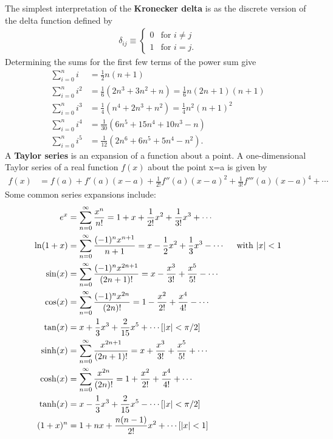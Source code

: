 The simplest interpretation of the \textbf{Kronecker delta} is as the discrete version of the delta function defined by 
\begin{align}
\delta_{ij}\equiv
\begin{cases}
0 & \textrm{for } i \neq j \\
1 & \textrm{for } i = j.
\end{cases}
\end{align}
Determining the sums for the first few terms of the power sum give
\begin{align}
\sum_{i=0}^{n}i   &=\frac{1}{2}n(n+1) \\
\sum_{i=0}^{n}i^2 &=\frac{1}{6}(2n^3+3n^2+n)=\frac{1}{6}n(2n+1)(n+1) \\
\sum_{i=0}^{n}i^3 &=\frac{1}{4}(n^4+2n^3+n^2)=\frac{1}{4}n^2(n+1)^2 \\
\sum_{i=0}^{n}i^4 &=\frac{1}{30}(6n^5+15n^4+10n^3-n) \\
\sum_{i=0}^{n}i^5 &=\frac{1}{12}(2n^6+6n^5+5n^4-n^2).
\end{align}
A \textbf{Taylor series} is an expansion of a function about a point. A one-dimensional Taylor series of a real function $f(x)$ about the point x=a is given by 
\begin{align}
f(x)&=f(a)+f'(a)(x-a)+\frac{1}{2!}f''(a)(x-a)^2+\frac{1}{3!}f'''(a)(x-a)^4+\cdots 
\end{align}
Some common series expansions include: 
\begin{align}
e^x&=\sum_{n=0}^{\infty} \frac{x^n}{n!}=1+x+\frac{1}{2!}x^2 +\frac{1}{3!}x^3 +\cdots \\ 
\ln(1+x)&=\sum_{n=0}^{\infty} \frac{(-1)^{n}x^{n+1}}{n+1}=x-\frac{1}{2}x^2 +\frac{1}{3}x^3 -\cdots\hspace{0.5cm} \textrm{with }|x|<1\\ 
\sin(x)&=\sum_{n=0}^{\infty}\frac{(-1)^{n}x^{2n+1}}{(2n+1)!} = x-\frac{x^3}{3!}+\frac{x^5}{5!}-\cdots \\
\cos(x)&=\sum_{n=0}^{\infty}\frac{(-1)^{n}x^{2n}}{(2n)!} = 1-\frac{x^2}{2!}+\frac{x^4}{4!}-\cdots \\
\tan(x)&= x+\frac{1}{3}x^3+\frac{2}{15}x^5+\cdots[|x|<\pi/2] \\
\sinh(x)&=\sum_{n=0}^{\infty}\frac{x^{2n+1}}{(2n+1)!} = x+\frac{x^3}{3!}+\frac{x^5}{5!}+\cdots \\
\cosh(x)&=\sum_{n=0}^{\infty}\frac{x^{2n}}{(2n)!} = 1+\frac{x^2}{2!}+\frac{x^4}{4!}+\cdots \\
\tanh(x)&= x-\frac{1}{3}x^3+\frac{2}{15}x^5-\cdots[|x|<\pi/2]\\
(1+x)^n&=1+nx+\frac{n(n-1)}{2!}x^2+\cdots[|x| < 1]
\end{align}	

